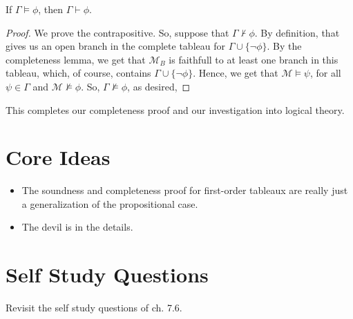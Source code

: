 \begin{enumerate}[\thesection.1]
                    \begin{theorem} If $\Gamma\vDash\phi$, then $\Gamma\vdash\phi$.
                    \end{theorem}
                    \begin{proof}
                      We prove the contrapositive. So, suppose that
                      $\Gamma\nvdash\phi$. By definition, that gives
                      us an open branch in the complete tableau for
                      $\Gamma\cup\{\neg\phi\}$. By the completeness
                      lemma, we get that $\mathcal{M}_B$ is faithfull
                      to at least one branch in this tableau, which,
                      of course, contains
                      $\Gamma\cup\{\neg\phi\}$. Hence, we get that
                      $\mathcal{M}\vDash \psi$, for all
                      $\psi\in\Gamma$ and
                      $\mathcal{M}\nvDash\phi$. So,
                      $\Gamma\nvDash\phi$, as desired,
                    \end{proof}

                    This completes our completeness proof and our
                    investigation into logical theory.
				
	\end{enumerate}        

\section{Core Ideas}

\begin{itemize}
	
		\item The soundness and completeness proof for
                  first-order tableaux are really just a
                  generalization of the propositional case. 

                  \item The devil is in the details.
	
\end{itemize}


\section{Self Study Questions}

Revisit the self study questions of ch. 7.6.

\newpage

